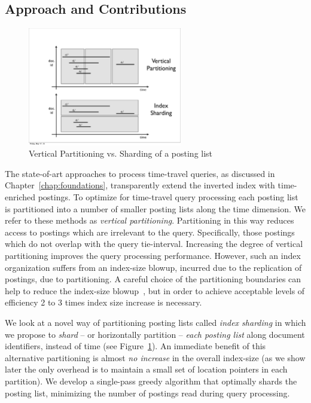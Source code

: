 \subsection{Approach and Contributions}
\label{chap:sharding:sec:approach}

\begin{figure}[htb]
  	\centering
		\includegraphics[width=0.6\textwidth]{resources/sharding-vs-vert.pdf}
   	\caption{Vertical Partitioning vs. Sharding of a posting list}
		  \label{fig:hor_vs_vert}	
\end{figure} 

The state-of-art approaches to process time-travel queries, as discussed in Chapter~\ref{chap:foundations}, transparently extend the inverted index with time-enriched postings. To optimize for time-travel query processing each posting list is partitioned into a number of smaller posting lists along the time dimension. We refer to these methods as \emph{vertical partitioning}. Partitioning in this way reduces access to postings which are irrelevant to the query. Specifically, those postings which do not overlap with the query tie-interval. Increasing the degree of vertical partitioning improves the query processing performance. However, such an index organization suffers from an index-size blowup, incurred due to the replication of postings, due to partitioning. A careful choice of the partitioning boundaries can help to reduce the index-size blowup~\cite{kberberi:sigir2007}, but in order to achieve acceptable levels of efficiency 2 to 3 times index size increase is necessary.


We look at a novel way of partitioning posting lists called \emph{index sharding} in which we propose to \emph{shard} -- or horizontally partition -- \emph{each posting list} along document identifiers, instead of time (see Figure~\ref{fig:hor_vs_vert}). 
An immediate benefit of this alternative partitioning is almost \emph{no increase} in the overall
index-size (as we show later the only overhead is to maintain a small set of location pointers in each partition). We develop a single-pass
greedy algorithm that optimally shards the posting list, minimizing the
number of postings read during query processing.

